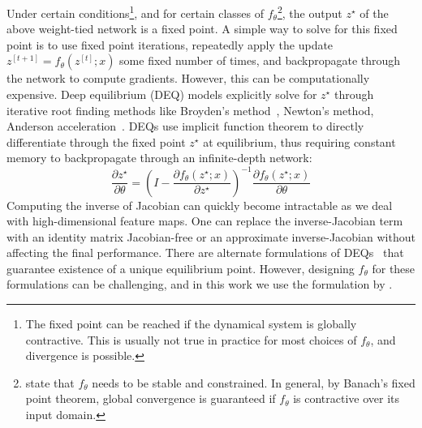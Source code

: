 Under certain conditions\footnote{The fixed point can be reached if the  dynamical system is globally contractive. This is usually not true in practice for most choices of $f_\theta$, and divergence is possible.}, and for certain classes of $f_\theta$\footnote{\citet{bai2019deep} state that $f_\theta$ needs to be stable and constrained. In general, by Banach's fixed point theorem, global convergence is guaranteed if $f_\theta$ is contractive over its input domain.}, the output $z^\star$ of the above weight-tied network is a fixed point. 
A simple way to solve for this fixed point is to use fixed point iterations, \ie repeatedly apply the update $z^{[t+1]} = f_\theta(z^{[t]}; x)$ some fixed number of times, and backpropagate through the network to compute gradients. However, this can be computationally expensive.
Deep equilibrium (DEQ) models \citep{bai2019deep} 
explicitly solve 
for $z^\star$
through iterative root finding methods like Broyden's method~\citep{broyden1965class}, Newton's method, Anderson acceleration~\citep{anderson1965iterative}. DEQs use implicit function theorem to directly differentiate through the fixed point $z^\star$ at equilibrium, thus requiring constant memory to backpropagate through an infinite-depth network:
\begin{equation}
    \dfrac{\partial z^\star}{\partial \theta} =  \left( I - \dfrac{\partial f_\theta(z^\star; x)}{\partial z^\star}\right)^{-1} \dfrac{\partial f_\theta (z^\star; x)}{\partial \theta} \label{eq:implcit-grad-deq}
\end{equation}
Computing the inverse of Jacobian can quickly become intractable as we deal with high-dimensional feature maps. One can replace the inverse-Jacobian term with an identity matrix \ie Jacobian-free \citep{fung2022jfb} or an approximate inverse-Jacobian \citep{geng2021training} without affecting the final performance. There are alternate formulations of DEQs~\citep{winston2020monotone} that guarantee existence of a unique equilibrium point. However, designing $f_\theta$ for these formulations can be challenging, and in this work we use the formulation by \citet{bai2019deep}.



